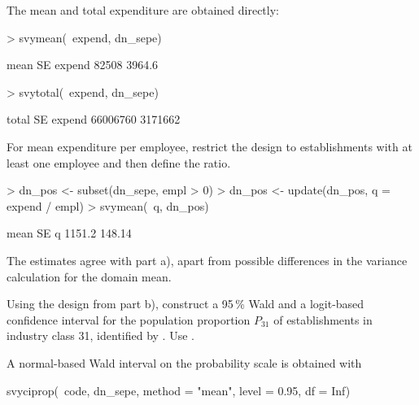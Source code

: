 \begin{Problem}
\begin{Subtask}
\begin{Solution}
        The mean and total expenditure are obtained directly:

\begin{Schunk}
\begin{Sinput}
> svymean(~expend, dn_sepe)
\end{Sinput}
\begin{Soutput}
        mean     SE
expend 82508 3964.6
\end{Soutput}
\begin{Sinput}
> svytotal(~expend, dn_sepe)
\end{Sinput}
\begin{Soutput}
          total      SE
expend 66006760 3171662
\end{Soutput}
\end{Schunk}

        For mean expenditure per employee, restrict the design to
        establishments with at least one employee and then define the ratio.

\begin{Schunk}
\begin{Sinput}
> dn_pos <- subset(dn_sepe, empl > 0)
> dn_pos <- update(dn_pos, q = expend / empl)
> svymean(~q, dn_pos)
\end{Sinput}
\begin{Soutput}
    mean     SE
q 1151.2 148.14
\end{Soutput}
\end{Schunk}

        The estimates agree with part a), apart from possible differences in
        the variance calculation for the domain mean.
    \end{Solution}

    \vspace{0.5em}
    \item Using the design from part b), construct a 95\,\% Wald and a
        logit-based confidence interval for the population proportion $P_{31}$
        of establishments in industry class 31, identified by .
        Use .

        \begin{Rhint}
            A normal-based Wald interval on the probability scale is obtained
            with

\begin{Scode}
svyciprop(~code, dn_sepe, method = "mean", level = 0.95, df = Inf)
\end{Scode}


\end{Rhint}
\end{Subtask}
\end{Problem}
